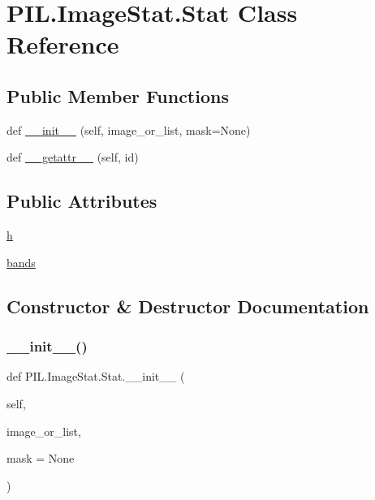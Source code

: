 \hypertarget{classPIL_1_1ImageStat_1_1Stat}{}\section{P\+I\+L.\+Image\+Stat.\+Stat Class Reference}
\label{classPIL_1_1ImageStat_1_1Stat}
\subsection*{Public Member Functions}
\begin{DoxyCompactItemize}
\item 
def \hyperlink{classPIL_1_1ImageStat_1_1Stat_a7f9c24c01efd763428c618a544d1258a}{\+\_\+\+\_\+init\+\_\+\+\_\+} (self, image\+\_\+or\+\_\+list, mask=None)
\item 
def \hyperlink{classPIL_1_1ImageStat_1_1Stat_aec9c7ec067bf04a320e15f406f6f394a}{\+\_\+\+\_\+getattr\+\_\+\+\_\+} (self, id)
\end{DoxyCompactItemize}
\subsection*{Public Attributes}
\begin{DoxyCompactItemize}
\item 
\hyperlink{classPIL_1_1ImageStat_1_1Stat_a3f5a0a36977df29c59e54f3cd53da6e9}{h}
\item 
\hyperlink{classPIL_1_1ImageStat_1_1Stat_a29cfd32e17638f351894872d28e06405}{bands}
\end{DoxyCompactItemize}


\subsection{Constructor \& Destructor Documentation}
\mbox{\label{classPIL_1_1ImageStat_1_1Stat_a7f9c24c01efd763428c618a544d1258a}} 
\subsubsection{\texorpdfstring{\+\_\+\+\_\+init\+\_\+\+\_\+()}{\_\_init\_\_()}}
{\footnotesize\ttfamily def P\+I\+L.\+Image\+Stat.\+Stat.\+\_\+\+\_\+init\+\_\+\+\_\+ (\begin{DoxyParamCaption}\item[{}]{self,  }\item[{}]{image\+\_\+or\+\_\+list,  }\item[{}]{mask = {\ttfamily None} }\end{DoxyParamCaption})}




